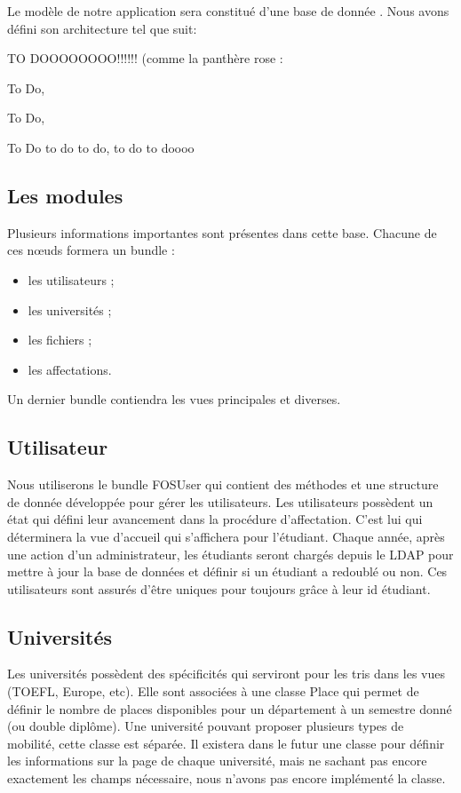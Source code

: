 Le modèle de notre application sera constitué d'une base de donnée \sql. Nous avons défini son architecture tel que suit:

TO DOOOOOOOO!!!!!! (comme la panthère rose : 

To Do,

To Do,

To Do  to do  to do, to do  to doooo


\subsection{Les modules}
Plusieurs informations importantes sont présentes dans cette base. Chacune de ces nœuds formera un bundle : 
\begin{itemize}
\item les utilisateurs ;
\item les universités ;
\item les fichiers ;
\item les affectations.
\end{itemize}
Un dernier bundle contiendra les vues principales et diverses.

\subsection{Utilisateur}

Nous utiliserons le bundle FOSUser qui contient des méthodes et une structure de donnée développée pour gérer les utilisateurs.
Les utilisateurs possèdent un état qui défini leur avancement dans la procédure d'affectation. C'est lui qui déterminera la vue d'accueil qui s'affichera pour l'étudiant. 
Chaque année, après une action d'un administrateur, les étudiants seront chargés depuis le LDAP pour mettre à jour la base de données et définir si un étudiant a redoublé ou non.
Ces utilisateurs sont assurés d'être uniques pour toujours grâce à leur id étudiant.

\subsection{Universités}

Les universités possèdent des spécificités qui serviront pour les tris dans les vues (TOEFL, Europe, etc).
Elle sont associées à une classe Place qui permet de définir le nombre de places disponibles pour un département à un semestre donné (ou double diplôme). Une université pouvant proposer plusieurs types de mobilité, cette classe est séparée.
Il existera dans le futur une classe pour définir les informations sur la page de chaque université, mais ne sachant pas encore exactement les champs nécessaire, nous n'avons pas encore implémenté la classe.

